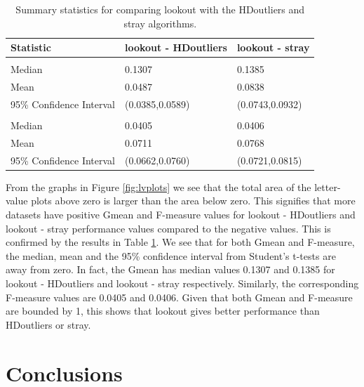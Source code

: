 \documentclass[11pt,a4paper,]{article}
\theoremstyle{definition}
\theoremstyle{definition}
\theoremstyle{definition}
\theoremstyle{remark}
\begin{document}
\begin{table}

\caption{\label{tab:table}Summary statistics for comparing lookout with the HDoutliers and stray algorithms.}
\centering
\begin{tabular}[t]{lll}
\toprule
Statistic & lookout - HDoutliers & lookout - stray\\
\midrule
\addlinespace[0.3em]
\multicolumn{3}{l}{\textbf{Fmeasure}}\\
\hspace{1em}Median & 0.1307 & 0.1385\\
\hspace{1em}Mean & 0.0487 & 0.0838\\
\hspace{1em}95\% Confidence Interval & (0.0385,0.0589) & (0.0743,0.0932)\\
\addlinespace[0.3em]
\multicolumn{3}{l}{\textbf{Gmean}}\\
\hspace{1em}Median & 0.0405 & 0.0406\\
\hspace{1em}Mean & 0.0711 & 0.0768\\
\hspace{1em}95\% Confidence Interval & (0.0662,0.0760) & (0.0721,0.0815)\\
\bottomrule
\end{tabular}
\end{table}

From the graphs in Figure \ref{fig:lvplots} we see that the total area of the letter-value plots above zero is larger than the area below zero. This signifies that more datasets have positive Gmean and F-measure values for lookout - HDoutliers and lookout - stray performance values compared to the negative values. This is confirmed by the results in Table \ref{tab:table}. We see that for both Gmean and F-measure, the median, mean and the 95\% confidence interval from Student's t-tests are away from zero. In fact, the Gmean has median values 0.1307 and 0.1385 for lookout - HDoutliers and lookout - stray respectively. Similarly, the corresponding F-measure values are 0.0405 and 0.0406. Given that both Gmean and F-measure are bounded by 1, this shows that lookout gives better performance than HDoutliers or stray.

\hypertarget{sec:conclusions}{%
\section{Conclusions}\label{sec:conclusions}}
\end{document}
